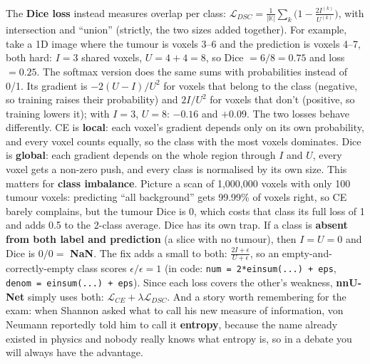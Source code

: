 \documentclass[a4paper]{article}
\newcommand{\K}[1]{\textcolor{kg}{\textbf{#1}}}
\newcommand{\F}[1]{\textcolor{fb}{#1}}
\newcommand{\E}[1]{\textcolor{ep}{#1}}
\newcommand{\T}[1]{\textcolor{tr}{\textbf{#1}}}
\begin{document}
 The \K{Dice loss} instead measures overlap per class: \F{$\mathcal L_{DSC}=\frac1{|\mathbb K|}\sum_k\big(1-\tfrac{2I^{(k)}}{U^{(k)}}\big)$}, with intersection  and ``union''  (strictly, the two sizes added together). For example, take a 1D image where the tumour is voxels 3--6 and the prediction is voxels 4--7, both hard: $I=3$ shared voxels, $U=4+4=8$, so \E{Dice $=6/8=0.75$ and loss $=0.25$}.
 The softmax version does the same sums with probabilities instead of 0/1. Its gradient is \F{$-2(U-I)/U^2$} for voxels that belong to the class (negative, so training raises their probability) and \F{$2I/U^2$} for voxels that don't (positive, so training lowers it); \E{with $I{=}3$, $U{=}8$: $-0.16$ and $+0.09$}. The two losses behave differently. CE is \K{local}: each voxel's gradient depends only on its own probability, and every voxel counts equally, so the class with the most voxels dominates. Dice is \K{global}: each gradient depends on the whole region through $I$ and $U$, every voxel gets a non-zero push, and every class is normalised by its own size. This matters for \K{class imbalance}. Picture a scan of 1{,}000{,}000 voxels with only 100 tumour voxels: predicting ``all background'' gets 99.99\% of voxels right, so CE barely complains, but the tumour Dice is 0, which costs that class its full loss of 1 and adds 0.5 to the 2-class average. Dice has its own trap. If a class is \T{absent from both label and prediction} (\E{a slice with no tumour}), then $I=U=0$ and Dice is $0/0=$ \T{NaN}. The fix adds a small \Nt{$\epsilon$} to both: \F{$\frac{2I+\epsilon}{U+\epsilon}$}, so an empty-and-correctly-empty class scores $\epsilon/\epsilon=1$ (in code: \E{\texttt{num = 2*einsum(...) + eps}, \texttt{denom = einsum(...) + eps}}). Since each loss covers the other's weakness, \K{nnU-Net} simply uses both: \F{$\mathcal L_{CE}+\lambda\mathcal L_{DSC}$}. And a story worth remembering for the exam: when Shannon asked what to call his new measure of information, von Neumann reportedly told him to call it \K{entropy}, because the name already existed in physics and \E{nobody really knows what entropy is, so in a debate you will always have the advantage}.
\end{document}
